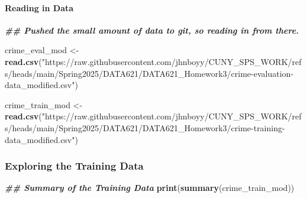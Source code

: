 \documentclass[
]{article}
\newenvironment{Shaded}{\begin{snugshade}}{\end{snugshade}}
\newcommand{\DocumentationTok}[1]{\textcolor[rgb]{0.56,0.35,0.01}{\textbf{\textit{#1}}}}
\newcommand{\FunctionTok}[1]{\textcolor[rgb]{0.13,0.29,0.53}{\textbf{#1}}}
\newcommand{\NormalTok}[1]{#1}
\newcommand{\OtherTok}[1]{\textcolor[rgb]{0.56,0.35,0.01}{#1}}
\newcommand{\StringTok}[1]{\textcolor[rgb]{0.31,0.60,0.02}{#1}}
\begin{document}
\paragraph{Reading in Data}\label{reading-in-data}

\begin{Shaded}
\begin{Highlighting}[]
\DocumentationTok{\#\# Pushed the small amount of data to git, so reading in from there.}

\NormalTok{crime\_eval\_mod }\OtherTok{\textless{}{-}} \FunctionTok{read.csv}\NormalTok{(}\StringTok{"https://raw.githubusercontent.com/jhnboyy/CUNY\_SPS\_WORK/refs/heads/main/Spring2025/DATA621/DATA621\_Homework3/crime{-}evaluation{-}data\_modified.csv"}\NormalTok{)}

\NormalTok{crime\_train\_mod }\OtherTok{\textless{}{-}} \FunctionTok{read.csv}\NormalTok{(}\StringTok{"https://raw.githubusercontent.com/jhnboyy/CUNY\_SPS\_WORK/refs/heads/main/Spring2025/DATA621/DATA621\_Homework3/crime{-}training{-}data\_modified.csv"}\NormalTok{)}
\end{Highlighting}
\end{Shaded}

\subsubsection{Exploring the Training
Data}\label{exploring-the-training-data}

\begin{Shaded}
\begin{Highlighting}[]
\DocumentationTok{\#\# Summary of the Training Data}
\FunctionTok{print}\NormalTok{(}\FunctionTok{summary}\NormalTok{(crime\_train\_mod))}
\end{Highlighting}
\end{Shaded}
\end{document}
